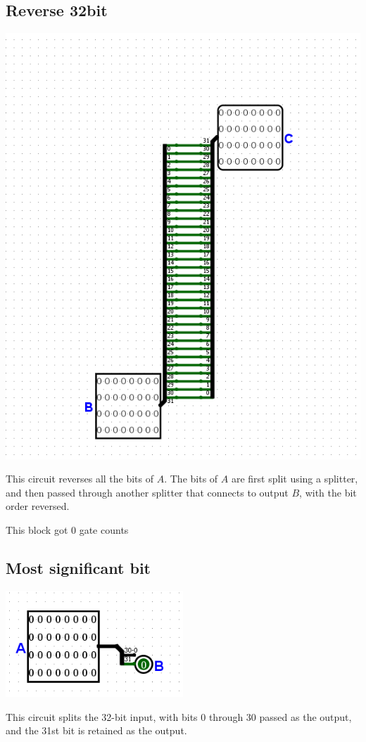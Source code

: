\documentclass{article}
\begin{document}
\subsection{Reverse 32bit}
\begin{center}
    \includegraphics[width=1\textwidth]{images/Reverse32.png}
\end{center}
\hspace{2em}This circuit reverses all the bits of \( A \). The bits of \( A \) are first split using a splitter, and then passed through another splitter that connects to output \( B \), with the bit order reversed.

\hspace{2em}This block got 0 gate counts
\subsection{Most significant bit}
\begin{center}
    \includegraphics[width=0.5\textwidth]{images/MSB.png}
\end{center}
\hspace{2em} This circuit splits the 32-bit input, with bits 0 through 30 passed as the output, and the 31st bit is retained as the output.
\end{document}
